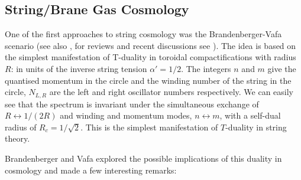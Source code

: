 \subsection{String/Brane Gas Cosmology}

One of the first approaches to string cosmology  was the Brandenberger-Vafa scenario \cite{Brandenberger:1988aj} (see also \cite{Tseytlin:1991xk}, for reviews and recent discussions see \cite{Battefeld:2005av,Brandenberger:2006vv}). The idea is based on the simplest manifestation of T-duality in toroidal compactifications with radius $R$:
\be
\setlength\fboxsep{0.25cm}
\setlength\fboxrule{0.4pt}
\ee
in units of the inverse string tension $\alpha'=1/2$. The integers $n$ and
 $m$ give the quantised momentum in the 
circle and the winding number of the string in the circle, $N_{L,R}$ are the 
left and right oscillator numbers respectively. 
We can easily see that the spectrum is invariant under the simultaneous exchange of $R\leftrightarrow 1/(2R)$
and winding and momentum modes, $n\leftrightarrow m$, with a self-dual radius of $R_c=1/\sqrt{2}$. This is  the simplest manifestation of $T$-duality in string theory.

Brandenberger and Vafa explored the possible implications of this duality in cosmology and made a few interesting remarks:

